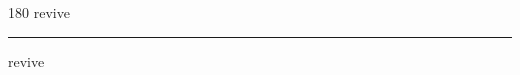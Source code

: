 
\begin{frame}
\begin{center}
\begin{turn}{180}
{\fontsize{2.5cm}{1em}\selectfont revive}
\end{turn}
\vspace{1em}\par  
\hrule
\vspace{1em}\par  
{\fontsize{2.5cm}{1em}\selectfont revive}
\end{center}
\end{frame}
